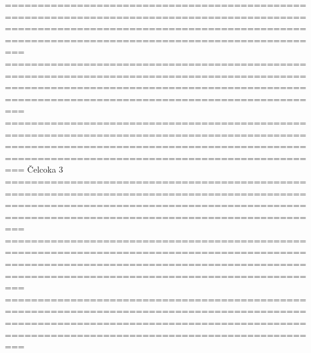 ===========================================================================================================================================================================================
===========================================================================================================================================================================================
===========================================================================================================================================================================================
Čelcoka 3
===========================================================================================================================================================================================
===========================================================================================================================================================================================
===========================================================================================================================================================================================

